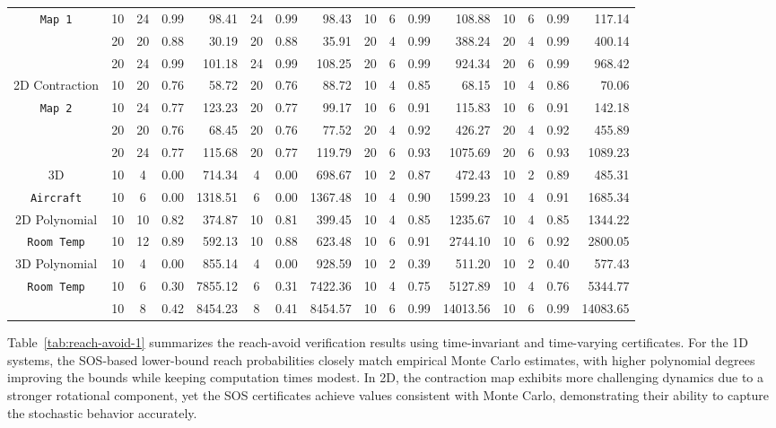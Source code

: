 \documentclass[journal,twoside,web]{ieeecolor}
\theoremstyle{definition}
\theoremstyle{plain}
\theoremstyle{plain}
\begin{document}
\begin{table}[t]
{\begin{tabular}{c|cccr | ccr | cccr | cccr}
     \texttt{Map 1} & 10 & 24 & 0.99  & 98.41 & 24 & 0.99 & 98.43 & 10 & 6 & 0.99 & 108.88 & 10 & 6 & 0.99 & 117.14 \\
     & 20 & 20 & 0.88 & 30.19  &  20 & 0.88 & 35.91 & 20 &  4 & 0.99 & 388.24 & 20 & 4 & 0.99 & 400.14 \\
    & 20 & 24& 0.99 &  101.18 & 24 & 0.99 & 108.25 & 20 & 6 & 0.99 & 924.34 & 20 & 6 & 0.99 & 968.42 \\
\cline{2-16} 
    {2D Contraction}  & 10 & 20 & 0.76 & 58.72 & 20 & 0.76 & 88.72 & 10 & 4 & 0.85 & 68.15 & 10 & 4 & 0.86 & 70.06 \\
 \texttt{Map 2}   & 10 & 24 & 0.77 & 123.23 & 20 & 0.77 & 99.17 & 10 & 6 & 0.91 & 115.83 & 10 & 6 & 0.91 & 142.18 \\ 
   & 20 & 20 & 0.76 & 68.45& 20 & 0.76 & 77.52 & 20 & 4 & 0.92 & 426.27 & 20 & 4 & 0.92 & 455.89 \\
    & 20 & 24 & 0.77 & 115.68 & 20 & 0.77 & 119.79 & 20 & 6 & 0.93 & 1075.69 & 20 & 6 & 0.93 & 1089.23\\
    \midrule
{3D} & 10 & 4 & 0.00 & 714.34 & 4 & 0.00 & 698.67 & 10 & 2 & 0.87 & 472.43 & 10 & 2 & 0.89 & 485.31\\
\texttt{Aircraft} & 10 & 6 & 0.00 & 1318.51 & 6 & 0.00 & 1367.48 & 10 & 4 & 0.90 & 1599.23 & 10 & 4 & 0.91 & 1685.34\\
  \midrule
    {2D Polynomial}& 10 & 10 & 0.82 & 374.87 & 10 &0.81  & 399.45 & 10 & 4 & 0.85 & 1235.67 & 10 & 4 & 0.85 & 1344.22 \\
 \texttt{Room Temp} & 10 & 12 & 0.89 & 592.13 & 10 & 0.88 & 623.48 & 10 & 6 & 0.91 & 2744.10 & 10 & 6 & 0.92 & 2800.05\\ 
 \midrule
    {3D Polynomial}  & 10 & 4 & 0.00 & 855.14 & 4 & 0.00 & 928.59 & 10 & 2 & 0.39 & 511.20 & 10 & 2 & 0.40 & 577.43 \\
     \texttt{Room Temp} & 10 & 6 &  0.30 & 7855.12 & 6 & 0.31  & 7422.36 & 10 & 4 & 0.75 & 5127.89 & 10 & 4 & 0.76 & 5344.77\\
    & 10 & 8 & 0.42 & 8454.23 & 8 & 0.41 & 8454.57 & 10 &  6  & 0.99 & 14013.56 & 10 & 6 & 0.99 & 14083.65\\ 
 \bottomrule
\end{tabular}
}
\end{table}

Table~\ref{tab:reach-avoid-1} summarizes the reach-avoid verification results using time-invariant and time-varying certificates.
For the 1D systems, the SOS-based lower-bound reach probabilities closely match empirical Monte Carlo estimates, with higher polynomial degrees improving the bounds while keeping computation times modest. In 2D, the contraction map exhibits more challenging dynamics due to a stronger rotational component, yet the SOS certificates achieve values consistent with Monte Carlo, demonstrating their ability to capture the stochastic behavior accurately. 
\end{document}
